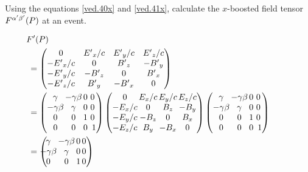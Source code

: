 \exm Using the equations \eqref{ved.40x} and 
\eqref{ved.41x}, calculate the  $x$-boosted field 
tensor $F^{{\alpha}'{\beta}'}(P)$ at an event.
\soln \begin{scriptsize}
\begin{align*}
\hspace{-24pt} F'(P) &\\
&\hspace{-24pt}=\begin{pmatrix}
0 &\pE_x/c & \pE_y/c&\pE_z/c \\
-\pE_x/c& 0 & \pB_z & -\pB_y \\
-\pE_y/c& -\pB_z & 0 & \pB_x \\
-\pE_z/c& \pB_y & -\pB_x & 0
\end{pmatrix}\notag \\
&\hspace{-24pt}=
\begin{pmatrix}   
\gamma &\nnt\nnnt -\gamma\gkb &\nnt\nnnt  0  
&\nnt\nnnt  0\\
-\gamma\gkb  &\nnt\nnnt \gamma &\nnt\nnnt 0 &\nnt\nnnt 0\\
0 &\nnt\nnnt  0 &\nnt\nnnt  1    &\nnt\nnnt 0\\ 
0  &\nnt \nnnt   0 &\nnt\nnnt  0 &\nnnt  1
\end{pmatrix}
\begin{pmatrix}
0 &\nnt\nnnt E_x/c      &\nnt\nnnt  E_y/c 
   &\nnt\nnnt E_z/c\\
-E_x/c&\nnt\nnnt  0 &\nnt\nnnt  B_z &\nnt\nnnt  -B_y\\
-E_y/c&\nnt\nnnt  -B_z &\nnt\nnnt  0  &\nnt\nnnt B_x\\
-E_z/c &\nnt\nnnt  B_y &\nnt\nnnt -B_x &\nnt\nnnt  0
\end{pmatrix}
\begin{pmatrix}
\gamma &\nnt\nnnt  -\gamma\gkb &\nnt\nnnt  0 &\nnt\nnnt  0\\
-\gamma\gkb &\nnt\nnnt  \gamma &\nnt\nnnt  0&\nnt\nnnt  0\\
0 &\nnt\nnnt 0 &\nnt\nnnt 1&\nnt\nnnt 0\\0 &\nnt\nnnt 0 
&\nnt\nnnt 0&\nnnt 1
\end{pmatrix}\notag \\
&\hspace{-24pt}
= \begin{pmatrix}  
\nnt\nnnt\gamma &\nnt\nnnt -\gamma\gkb &\nnt\nnnt 
0&\nnt\nnnt 0\\
\nnt\nnnt-\gamma\gkb &\nnt\nnnt \gamma &\nnt\nnnt 
0&\nnt\nnnt 0\\
\nnt\nnnt 0 &\nnt\nnnt 0 & \nnt\nnnt 1&\nnt\nnnt 0\\

\end{pmatrix}
\end{align*}
\end{scriptsize}
